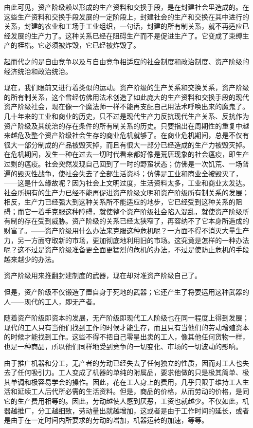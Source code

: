     由此可见，资产阶级赖以形成的生产资料和交换手段，是在封建社会里造成的。在这些生产资料和交换手段发展的一定阶段上，封建社会的生产和交换在其中进行的关系，封建的农业和工场手工业组织，一句话，封建的所有制关系，就不再适应已经发展的生产力了。这种关系已经在阻碍生产而不是促进生产了。它变成了束缚生产的桎梏。它必须被炸毁，它已经被炸毁了。

    起而代之的是自由竞争以及与自由竞争相适应的社会制度和政治制度、资产阶级的经济统治和政治统治。

    现在，我们眼前又进行着类似的运动。资产阶级的生产关系和交换关系，资产阶级的所有制关系，这个曾经仿佛用法术创造了如此庞大的生产资料和交换手段的现代资产阶级社会，现在像一个魔法师一样不能再支配自己用法术呼唤出来的魔鬼了。几十年来的工业和商业的历史，只不过是现代生产力反抗现代生产关系、反抗作为资产阶级及其统治的存在条件的所有制关系的历史。只要指出在周期性的重复中越来越危及整个资产阶级社会生存的商业危机就够了。在商业危机期间，总是不仅有很大一部分制成的产品被毁灭掉，而且有很大一部分已经造成的生产力被毁灭掉。在危机期间，发生一种在过去一切时代看来都好像是荒唐现象的社会瘟疫，即生产过剩的瘟疫。社会突然发现自己回到了一时的野蛮状态；仿佛是一次饥荒、一场普遍的毁灭性战争，使社会失去了全部生活资料；仿佛是工业和商业全被毁灭了，——这是什么缘故呢？因为社会上文明过度，生活资料太多，工业和商业太发达。社会所拥有的生产力已经不能再促进资产阶级文明和资产阶级所有制关系的发展；相反，生产力已经强大到这种关系所不能适应的地步，它已经受到这种关系的阻碍；而它一着手克服这种障碍，就使整个资产阶级社会陷入混乱，就使资产阶级所有制的存在受到威胁。资产阶级的关系已经太狭窄了，再容纳不了它本身所造成的财富了。——资产阶级用什么办法来克服这种危机呢？一方面不得不消灭大量生产力，另一方面夺取新的市场，更加彻底地利用旧的市场。这究竟是怎样的一种办法呢？这不过是资产阶级准备更全面更猛烈的危机的办法，不过是使防止危机的手段越来越少的办法。

    资产阶级用来推翻封建制度的武器，现在却对准资产阶级自己了。

    但是，资产阶级不仅锻造了置自身于死地的武器；它还产生了将要运用这种武器的人——现代的工人，即无产者。

    随着资产阶级即资本的发展，无产阶级即现代工人阶级也在同一程度上得到发展；现代的工人只有当他们找到工作的时候才能生存，而且只有当他们的劳动增殖资本的时候才能找到工作。这些不得不把自己零星出卖的工人，像其他任何货物一样，也是一种商品，所以他们同样地受到竞争的一切变化、市场的一切波动的影响。

    由于推广机器和分工，无产者的劳动已经失去了任何独立的性质，因而对工人也失去了任何吸引力。工人变成了机器的单纯的附属品，要求他做的只是极其简单、极其单调和极容易学会的操作。因此，花在工人身上的费用，几乎只限于维持工人生活和延续工人后代所必需的生活资料。但是，商品的价格，从而劳动的价格，是同它的生产费用相等的。因此，劳动越使人感到厌恶，工资也就越少。不仅如此，机器越推广，分工越细致，劳动量出就越增加，这或者是由于工作时间的延长，或者是由于在一定时间内所要求的劳动的增加，机器运转的加速，等等。

